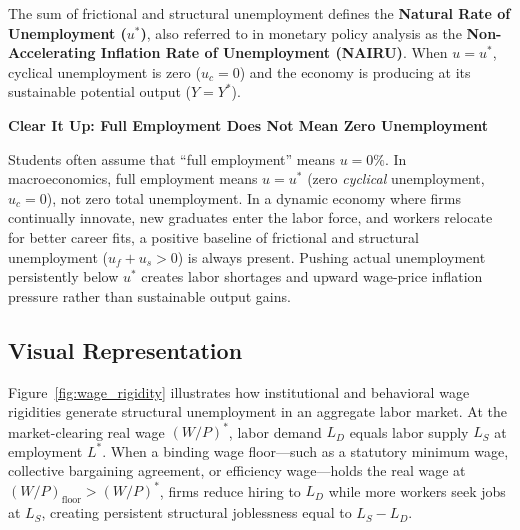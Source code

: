 \documentclass[11pt, a4paper]{article}
\newcommand{\boxheader}[2]{\textbf{\textcolor{#1}{#2}}\par\smallskip}
\begin{document}
The sum of frictional and structural unemployment defines the \textbf{Natural Rate of Unemployment ($u^*$)}, also referred to in monetary policy analysis as the \textbf{Non-Accelerating Inflation Rate of Unemployment (NAIRU)}. When $u = u^*$, cyclical unemployment is zero ($u_c = 0$) and the economy is producing at its sustainable potential output ($Y = Y^*$).

\begin{coreprinciple}
\boxheader{Terracotta}{Clear It Up: Full Employment Does Not Mean Zero Unemployment}
Students often assume that ``full employment'' means $u = 0\%$. In macroeconomics, full employment means $u = u^*$ (zero \emph{cyclical} unemployment, $u_c = 0$), not zero total unemployment. In a dynamic economy where firms continually innovate, new graduates enter the labor force, and workers relocate for better career fits, a positive baseline of frictional and structural unemployment ($u_f + u_s > 0$) is always present. Pushing actual unemployment persistently below $u^*$ creates labor shortages and upward wage-price inflation pressure rather than sustainable output gains.
\end{coreprinciple}

\subsection*{Visual Representation}
Figure~\ref{fig:wage_rigidity} illustrates how institutional and behavioral wage rigidities generate structural unemployment in an aggregate labor market. At the market-clearing real wage $(W/P)^*$, labor demand $L_D$ equals labor supply $L_S$ at employment $L^*$. When a binding wage floor—such as a statutory minimum wage, collective bargaining agreement, or efficiency wage—holds the real wage at $(W/P)_{\text{floor}} > (W/P)^*$, firms reduce hiring to $L_D$ while more workers seek jobs at $L_S$, creating persistent structural joblessness equal to $L_S - L_D$.
\end{document}
